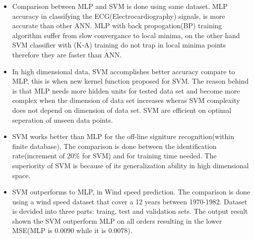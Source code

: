 \begin{itemize}
	
	\item Comparison between MLP and SVM is done using same dataset. MLP accuracy in classifying the ECG(Electrocardiography) signals, is more accurate than other ANN. MLP with back propogation(BP) training algorithm suffer from slow convergance to local minima, on the other hand SVM classifier with (K-A) training do not trap in local minima points therefore they are faster than ANN. \cite{Moavenian20103088}
	\item  In high dimensional data, SVM accomplishes better accuracy compare to MLP, this is when new kernel function proposed for SVM. The reason behind is that MLP needs more hidden units for tested data set and become more complex when the dimension of data set increases wheras SVM complexity does not depend on dimension of data set. SVM are efficient on optimal seperation of unseen data points.\cite{Zanaty2012177}
	\item SVM works better than MLP for the off-line signiture recognition(within finite database), The comparison is done between the identification rate(increment of 20\% for SVM) and for training time needed. The superiority of SVM is because of its generalization ability in high dimensional space\cite{FriasMartinez2006693}.

	\item SVM outperforms to MLP, in Wind speed prediction. The comparison is done using a wind speed dataset that cover a 12 years between 1970-1982. Dataset is devided into three parts: traing, test and validation sets. The output result shown the SVM outperform MLP on all orders resulting in the lower MSE(MLP is 0.0090 while it is 0.0078)\cite{Mohandes2004939}.

	
    

\end{itemize}



	